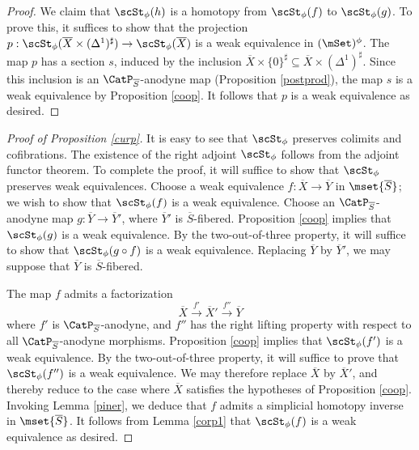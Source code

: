 \begin{proof}
We claim that $\scSt_{\phi}(h)$ is a homotopy from $\scSt_{\phi}(f)$ to $\scSt_{\phi}(g)$. 
To prove this, it suffices to show that the projection $p: \scSt_{\phi}( \overline{X} \times (\Delta^1)^{\sharp})
\rightarrow \scSt_{\phi}( \overline{X})$ is a weak equivalence in $(\mSet)^{\phi}$. The map $p$
has a section $s$, induced by the inclusion $\overline{X} \times \{0\}^{\sharp}
\subseteq \overline{X} \times (\Delta^1)^{\sharp}$. Since this inclusion is an
$\CatP_{\overline{S}}$-anodyne map (Proposition \ref{postprod}), the map
$s$ is a weak equivalence by Proposition \ref{coop}. It follows that $p$ is a weak equivalence as desired.
\end{proof}

\begin{proof}[Proof of Proposition \ref{curp}]
It is easy to see that $\scSt_{\phi}$ preserves colimits and cofibrations. 
The existence of the right adjoint $\scSt_{\phi}$ follows from the adjoint functor theorem.
To complete the proof, it will suffice to show that $\scSt_{\phi}$ preserves weak equivalences.
Choose a weak equivalence $f: \overline{X} \rightarrow \overline{Y}$ in $\mset{ \overline{S} }$;
we wish to show that $\scSt_{\phi}(f)$ is a weak equivalence. Choose an $\CatP_{\overline{S}}$-anodyne map $g: \overline{Y} \rightarrow \overline{Y}'$, where $\overline{Y}'$ is $\overline{S}$-fibered. Proposition \ref{coop} implies that $\scSt_{\phi}(g)$ is a weak equivalence. By the two-out-of-three property, it will suffice to show that
$\scSt_{\phi}(g \circ f)$ is a weak equivalence. Replacing $\overline{Y}$ by $\overline{Y}'$, we may suppose that $\overline{Y}$ is $\overline{S}$-fibered.

The map $f$ admits a factorization
$$ \overline{X} \stackrel{f'}{\rightarrow} \overline{X}' \stackrel{f''}{\rightarrow} \overline{Y}$$
where $f'$ is $\CatP_{\overline{S}}$-anodyne, and $f''$ has the right lifting property with respect to all $\CatP_{\overline{S}}$-anodyne morphisms. Proposition \ref{coop} implies that
$\scSt_{\phi}(f')$ is a weak equivalence. By the two-out-of-three property, it will suffice to prove
that $\scSt_{\phi}(f'')$ is a weak equivalence. We may therefore replace $\overline{X}$ by
$\overline{X}'$, and thereby reduce to the case where $\overline{X}$ satisfies the hypotheses of Proposition \ref{coop}. Invoking Lemma \ref{piner}, we deduce that $f$ admits a simplicial homotopy inverse in $\mset{\overline{S}}$. It follows from Lemma \ref{corp1} that $\scSt_{\phi}(f)$ is a weak equivalence as desired.
\end{proof}

